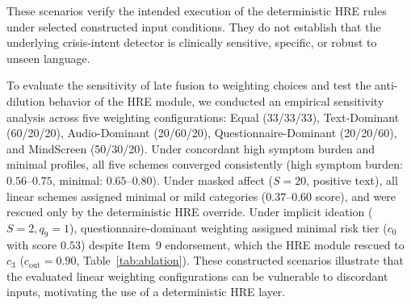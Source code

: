 \documentclass[10pt, conference, letterpaper]{IEEEtran}
\begin{document}
\begin{table}[!t]
\caption{HRE Verification: Adversarial Masking Scenarios}
\label{tab:hre_verify}
\centering
{}
\end{table}

These scenarios verify the intended execution of the deterministic HRE rules
under selected constructed input conditions. They do not establish that the
underlying crisis-intent detector is clinically sensitive, specific, or robust
to unseen language.

To evaluate the sensitivity of late fusion to weighting choices and test the
anti-dilution behavior of the HRE module, we conducted an empirical sensitivity
analysis across five weighting configurations: Equal (33/33/33), Text-Dominant
(60/20/20), Audio-Dominant (20/60/20), Questionnaire-Dominant (20/20/60), and
MindScreen (50/30/20).
Under concordant high symptom burden and minimal profiles, all five schemes converged
consistently (high symptom burden: $0.56$--$0.75$, minimal: $0.65$--$0.80$).
Under masked affect ($S=20$, positive text), all linear schemes assigned
minimal or mild categories ($0.37$--$0.60$ score), and were rescued only by the
deterministic HRE override.
Under implicit ideation ($S=2, q_9=1$), questionnaire-dominant weighting
assigned minimal risk tier ($c_0$ with score $0.53$) despite Item~9 endorsement,
which the HRE module rescued to $c_3$ ($c_{\text{out}} = 0.90$, Table~\ref{tab:ablation}).
These constructed scenarios illustrate that the evaluated linear weighting
configurations can be vulnerable to discordant inputs, motivating the use of a
deterministic HRE layer.
\end{document}
